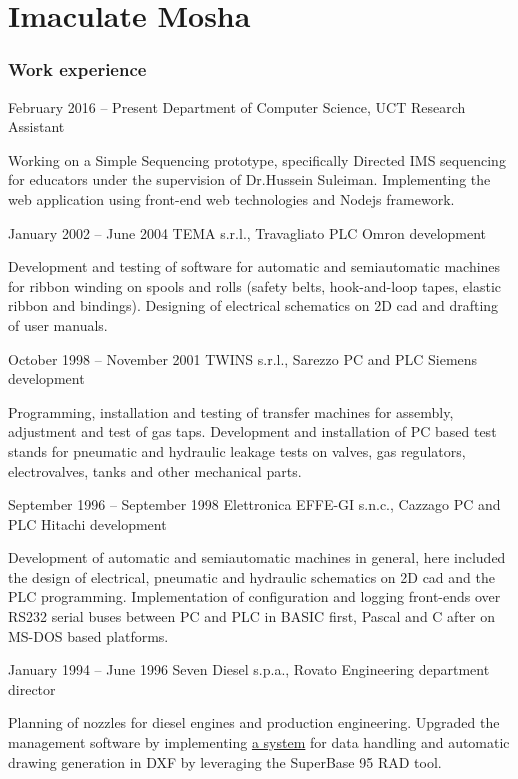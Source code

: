 \documentclass[fontsize=10pt]{tccv}
\begin{document}
\part{Imaculate Mosha}

\section{Work experience}

\begin{eventlist}

\item{February 2016 -- Present}
	 {Department of Computer Science, UCT}
	 {Research Assistant}
	 
Working on a Simple Sequencing prototype, specifically Directed IMS sequencing for educators under the supervision of Dr.Hussein Suleiman.  
Implementing the web application using front-end web technologies and Nodejs framework. 


\item{January 2002 -- June 2004}
     {TEMA s.r.l., Travagliato}
     {PLC Omron development}

Development and testing of software for automatic and semiautomatic
machines for ribbon winding on spools and rolls (safety belts,
hook-and-loop tapes, elastic ribbon and bindings). Designing of
electrical schematics on 2D cad and drafting of user manuals.

\item{October 1998 -- November 2001}
     {TWINS s.r.l., Sarezzo}
     {PC and PLC Siemens development}

Programming, installation and testing of transfer machines for assembly,
adjustment and test of gas taps. Development and installation of PC
based test stands for pneumatic and hydraulic leakage tests on valves,
gas regulators, electrovalves, tanks and other mechanical parts.

\item{September 1996 -- September 1998}
     {Elettronica EFFE-GI s.n.c., Cazzago}
     {PC and PLC Hitachi development}

Development of automatic and semiautomatic machines in general, here
included the design of electrical, pneumatic and hydraulic schematics on
2D cad and the PLC programming. Implementation of configuration and
logging front-ends over RS232 serial buses between PC and PLC in BASIC
first, Pascal and C after on MS-DOS based platforms.

\item{January 1994 -- June 1996}
     {Seven Diesel s.p.a., Rovato}
     {Engineering department director}

Planning of nozzles for diesel engines and production engineering.
Upgraded the management software by implementing
\href{http://adg.entidi.com/home/history/}{a system} for data handling
and automatic drawing generation in DXF by leveraging the SuperBase 95
RAD tool.

\end{eventlist}
\end{document}

